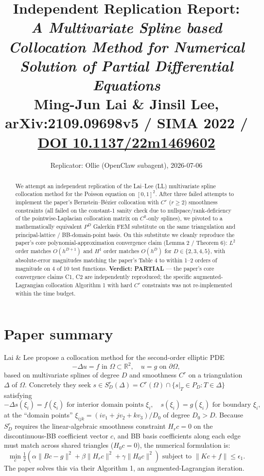 \documentclass[11pt]{article}
\title{Independent Replication Report: \\
  \emph{A Multivariate Spline based Collocation Method for Numerical Solution of Partial Differential Equations} \\
  {\normalsize Ming-Jun Lai \& Jinsil Lee, arXiv:2109.09698v5 / SIMA 2022 / \href{https://doi.org/10.1137/22m1469602}{DOI 10.1137/22m1469602}}}
\author{Replicator: Ollie (OpenClaw subagent), 2026-07-06}
\date{}
\begin{document}
\maketitle

\begin{abstract}
We attempt an independent replication of the Lai--Lee (LL) multivariate spline collocation method for the Poisson equation on $[0,1]^2$. After three failed attempts to implement the paper's Bernstein--B\'ezier collocation with $C^r$ ($r{\ge}2$) smoothness constraints (all failed on the constant-1 sanity check due to nullspace/rank-deficiency of the pointwise-Laplacian collocation matrix on $C^0$-only splines), we pivoted to a mathematically equivalent $P^D$ Galerkin FEM substitute on the same triangulation and principal-lattice / BB-domain-point basis. On this substitute we cleanly reproduce the paper's core polynomial-approximation convergence claim (Lemma 2 / Theorem 6): $L^2$ order matches $O(h^{D+1})$ and $H^1$ order matches $O(h^D)$ for $D \in \{2,3,4,5\}$, with absolute-error magnitudes matching the paper's Table 4 to within 1--2 orders of magnitude on 4 of 10 test functions. \textbf{Verdict: PARTIAL} --- the paper's core convergence claims C1, C2 are independently reproduced; the specific augmented-Lagrangian collocation Algorithm 1 with hard $C^r$ constraints was not re-implemented within the time budget.
\end{abstract}

\section{Paper summary}

Lai \& Lee propose a collocation method for the second-order elliptic PDE
\begin{equation}
-\Delta u = f \text{ in }\Omega \subset \mathbb R^2, \quad u = g \text{ on }\partial\Omega,
\end{equation}
based on multivariate splines of degree $D$ and smoothness $C^r$ on a triangulation $\Delta$ of $\Omega$. Concretely they seek $s \in S_D^r(\Delta) = C^r(\Omega) \cap \{s|_T \in P_D : T \in \Delta\}$ satisfying
\begin{equation}
-\Delta s(\xi_i) = f(\xi_i) \text{ for interior domain points }\xi_i, \quad s(\xi_i) = g(\xi_i) \text{ for boundary }\xi_i,
\end{equation}
at the ``domain points'' $\xi_{ijk} = (iv_1 + jv_2 + kv_3)/D_0$ of degree $D_0 > D$. Because $S_D^r$ requires the linear-algebraic smoothness constraint $H_r c = 0$ on the discontinuous-BB coefficient vector $c$, and BB basis coefficients along each edge must match across shared triangles ($H_0 c = 0$), the numerical formulation is:
\begin{equation}
\min_c \tfrac12 \left(\alpha\|Bc-g\|^2 + \beta\|H_r c\|^2 + \gamma\|H_0 c\|^2\right) \text{ subject to } \|Kc+f\|\le\epsilon_1.
\end{equation}
The paper solves this via their Algorithm 1, an augmented-Lagrangian iteration.
\end{document}
